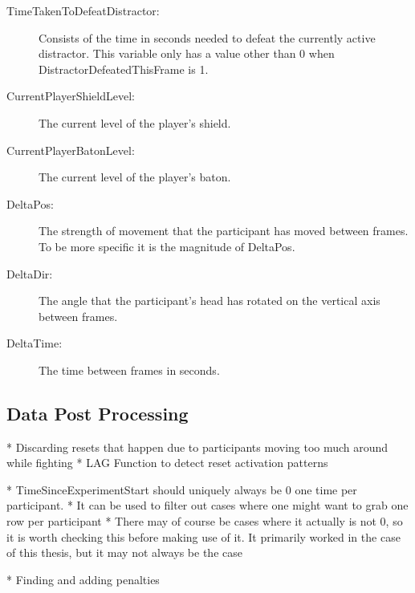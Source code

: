 \begin{description}
   \item[TimeTakenToDefeatDistractor:] Consists of the time in seconds needed to defeat the currently active distractor. This variable only has a value other than 0 when DistractorDefeatedThisFrame is 1. 
   \item[CurrentPlayerShieldLevel:] The current level of the player's shield. 
   \item[CurrentPlayerBatonLevel:] The current level of the player's baton. 
   \item[DeltaPos:] The strength of movement that the participant has moved between frames. To be more specific it is the magnitude of DeltaPos. 
   \item[DeltaDir:] The angle that the participant's head has rotated on the vertical axis between frames.
   \item[DeltaTime:] The time between frames in seconds.
\end{description}


\subsection{Data Post Processing}\label{sec:ex2postprocessingdetails}
  * Discarding resets that happen due to participants moving too much around while fighting
  * LAG Function to detect reset activation patterns
 
 * TimeSinceExperimentStart should uniquely always be 0 one time per participant.    
    * It can be used to filter out cases where one might want to grab one row per participant
    * There may of course be cases where it actually is not 0, so it is worth checking this before making use of it. It primarily worked in the case of this thesis, but it may not always be the case

* Finding and adding penalties